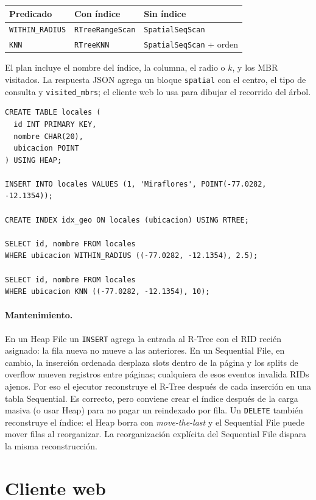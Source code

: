 \documentclass[11pt,a4paper]{article}
\newcommand{\code}[1]{\texttt{#1}}
\begin{document}
\begin{center}
\begin{tabular}{lll}
\hline
Predicado & Con índice & Sin índice \\
\hline
\code{WITHIN\_RADIUS} & \code{RTreeRangeScan} & \code{SpatialSeqScan} \\
\code{KNN} & \code{RTreeKNN} & \code{SpatialSeqScan} + orden \\
\hline
\end{tabular}
\end{center}

El plan incluye el nombre del índice, la columna, el radio o \(k\), y los MBR
visitados. La respuesta JSON agrega un bloque \code{spatial} con el centro, el
tipo de consulta y \code{visited\_mbrs}; el cliente web lo usa para dibujar el
recorrido del árbol.

\begin{verbatim}
CREATE TABLE locales (
  id INT PRIMARY KEY,
  nombre CHAR(20),
  ubicacion POINT
) USING HEAP;

INSERT INTO locales VALUES (1, 'Miraflores', POINT(-77.0282, -12.1354));

CREATE INDEX idx_geo ON locales (ubicacion) USING RTREE;

SELECT id, nombre FROM locales
WHERE ubicacion WITHIN_RADIUS ((-77.0282, -12.1354), 2.5);

SELECT id, nombre FROM locales
WHERE ubicacion KNN ((-77.0282, -12.1354), 10);
\end{verbatim}

\paragraph{Mantenimiento.} En un Heap File un \code{INSERT} agrega la entrada al
R-Tree con el RID recién asignado: la fila nueva no mueve a las anteriores. En
un Sequential File, en cambio, la inserción ordenada desplaza slots dentro de la
página y los splits de overflow mueven registros entre páginas; cualquiera de
esos eventos invalida RIDs ajenos. Por eso el ejecutor reconstruye el R-Tree
después de cada inserción en una tabla Sequential. Es correcto, pero conviene
crear el índice después de la carga masiva (o usar Heap) para no pagar un
reindexado por fila. Un \code{DELETE} también reconstruye el índice: el Heap
borra con \emph{move-the-last} y el Sequential File puede mover filas al
reorganizar. La reorganización explícita del Sequential File dispara la misma
reconstrucción.

\section{Cliente web}
\end{document}
